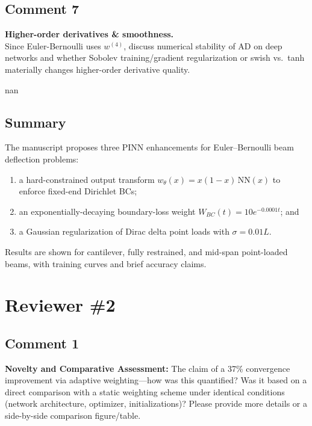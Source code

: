 \documentclass{ar2rc}
\begin{document}
  \subsection{Comment 7}
  \RC\textbf{Higher-order derivatives \& smoothness.}\\
    Since Euler-Bernoulli uses $w^{(4)}$, discuss numerical stability of AD on deep networks and whether Sobolev training/gradient regularization or swish vs.\ tanh materially changes higher-order derivative quality.
	
  \AR nan

  \subsection*{Summary}
  The manuscript proposes three PINN enhancements for Euler--Bernoulli beam deflection problems:
  \begin{enumerate}
      \item a hard-constrained output transform $w_\theta(x)=x(1-x)\,\mathrm{NN}(x)$ to enforce fixed-end Dirichlet BCs;
      \item an exponentially-decaying boundary-loss weight $W_{BC}(t)=10e^{-0.0001t}$; and
      \item a Gaussian regularization of Dirac delta point loads with $\sigma=0.01L$.
  \end{enumerate}
  Results are shown for cantilever, fully restrained, and mid-span point-loaded beams, with training curves and brief accuracy claims.



	\newpage
	\section{Reviewer \#2}

  \subsection{Comment 1}

	\RC\textbf{Novelty and Comparative Assessment:} The claim of a 37\% convergence improvement via adaptive weighting—how was this quantified? Was it based on a direct comparison with a static weighting scheme under identical conditions (network architecture, optimizer, initializations)? Please provide more details or a side-by-side comparison figure/table.
	
\end{document}
